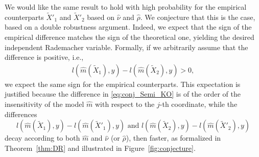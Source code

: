 \documentclass{article}
\theoremstyle{plain}
\theoremstyle{definition}
\theoremstyle{remark}
\begin{document}
We would like the same result to hold with high probability for the empirical counterparts $\widetilde{X}'_1$ and $\widetilde{X}'_2$ based on $\widehat{\nu}$ and $\widehat{\rho}$. We conjecture that this is the case, based on a double robustness argument. Indeed, we expect that the sign of the empirical difference matches the sign of the theoretical one, yielding the desired independent Rademacher variable. Formally, if we arbitrarily assume that the difference is positive, i.e.,
\begin{align}
    l(\widehat{m}(\widetilde{X}_1), y)- l(\widehat{m}(\widetilde{X}_2), y)>0,\label{eq:conj_Semi_KO}
\end{align}
we expect the same sign for the empirical counterparts. This expectation is justified because the difference in \eqref{eq:conj_Semi_KO} is of the order of the insensitivity of the model $\widehat{m}$ with respect to the $j$-th coordinate, while the differences 
\[
l(\widehat{m}(\widetilde{X}_1), y) - l(\widehat{m}(\widetilde{X}'_1), y) \text{ and } l(\widehat{m}(\widetilde{X}_2), y) - l(\widehat{m}(\widetilde{X}'_2), y)
\]
%
decay according to both $\widehat{m}$ and $\widehat{\nu}$ (or $\widehat{\rho}$), then faster, as formalized in Theorem~\ref{thm:DR} and illustrated in Figure~\ref{fig:conjecture}.
%
\end{document}
